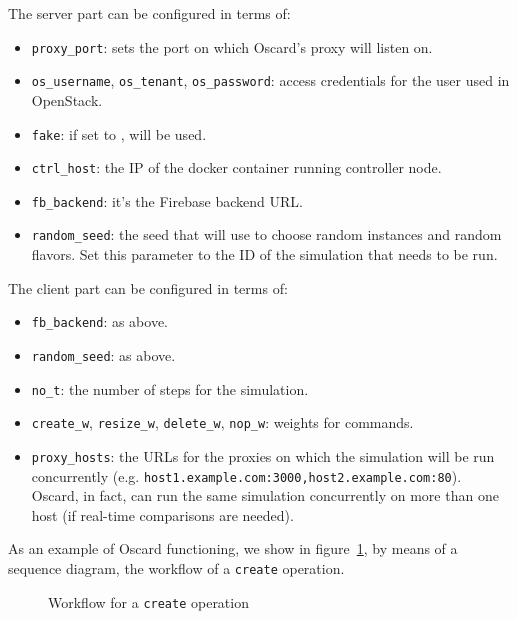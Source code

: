 The server part can be configured in terms of:
\begin{itemize}
	\item \texttt{proxy\_port}: sets the port on which Oscard's proxy will listen on.
	\item \texttt{os\_username}, \texttt{os\_tenant}, \texttt{os\_password}: access credentials for the user used in OpenStack.
	\item \texttt{fake}: if set to ,  will be used.
	\item \texttt{ctrl\_host}: the IP of the docker container running controller node.
	\item \texttt{fb\_backend}: it's the Firebase backend URL.
	\item \texttt{random\_seed}: the seed that  will use to choose random instances and random flavors. Set this parameter to the ID of the simulation that needs to be run.
\end{itemize}

The client part can be configured in terms of:
\begin{itemize}
	\item \texttt{fb\_backend}: as above.
	\item \texttt{random\_seed}: as above.
	\item \texttt{no\_t}: the number of steps for the simulation.
	\item \texttt{create\_w}, \texttt{resize\_w}, \texttt{delete\_w}, \texttt{nop\_w}: weights for commands.
	\item \texttt{proxy\_hosts}: the URLs for the proxies on which the simulation will be run concurrently (e.g. \texttt{host1.example.com:3000,host2.example.com:80}). Oscard, in fact, can run the same simulation concurrently on more than one host (if real-time comparisons are needed).
\end{itemize}

As an example of Oscard functioning, we show in figure~\ref{fig:oscard_functioning}, by means of a sequence diagram, the workflow of a \texttt{create} operation. 


\begin{figure}[!ht]
\label{fig:oscard_functioning}
\caption{Workflow for a \texttt{create} operation}
\end{figure}



